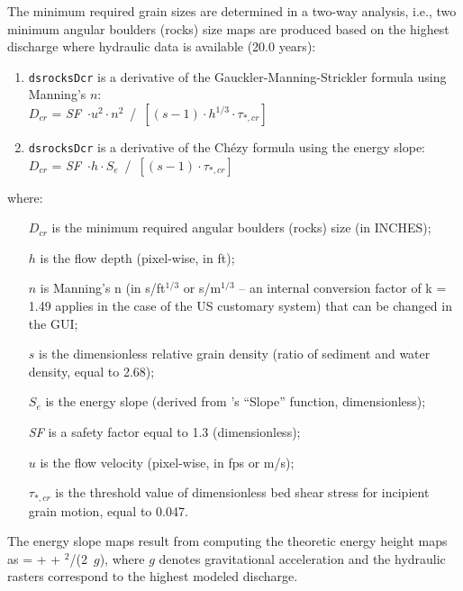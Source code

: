 The minimum required grain sizes are determined in a two-way analysis, i.e., two minimum angular boulders (rocks) size maps are produced based on the highest discharge where hydraulic data is available (20.0 years):
\begin{enumerate}
	\item \texttt{ds{\myUnderscore}rocks{\myUnderscore}Dcr} is a derivative of the Gauckler-Manning-Strickler formula using Manning's $n$:\\
	$D_{cr}$ = \textit{SF}~$\cdot u^2 \cdot n^2$~/~$\left[\left(s - 1\right) \cdot h^{1/3} \cdot \tau_{*,cr} \right]$
	\item \texttt{ds{\myUnderscore}rocks{\myUnderscore}Dcr} is a derivative of the Ch\'ezy formula using the energy slope:\\
	$D_{cr}$ = \textit{SF}~$\cdot h \cdot S_e$~/~$\left[\left(s - 1\right) \cdot \tau_{*,cr} \right]$
\end{enumerate}
where:
\begin{itemize}
	\item[$D_{cr}$] is the minimum required angular boulders (rocks) size (in INCHES);
	\item[$h$] is the flow depth (pixel-wise, in ft);
	\item[$n$] is Manning's n (in s/ft$^{1/3}$ or s/m$^{1/3}$ -- an internal conversion factor of k = 1.49 applies in the case of the US customary system) that can be changed in the GUI;
	\item[$s$] is the dimensionless relative grain density (ratio of sediment and water density, equal to 2.68);
	\item[$S_e$] is the energy slope (derived from 's ``Slope'' function, dimensionless);
	\item[\textit{SF}] is a safety factor equal to 1.3 (dimensionless);
	\item[$u$] is the flow velocity (pixel-wise, in fps or m/s);
	\item[$\tau_{*,cr}$] is the threshold value of dimensionless bed shear stress for incipient grain motion, equal to 0.047.
\end{itemize}
The energy slope maps result from computing the theoretic energy height maps as  =  +  + $^2$/(2~$g$), where $g$ denotes gravitational acceleration and the hydraulic rasters correspond to the highest modeled discharge.

